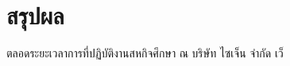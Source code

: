 \chapter{สรุปผล}
\label{chapter:conclusion}

ตลอดระยะเวลาการที่ปฏิบัติงานสหกิจศึกษา ณ บริษัท ไซเจ็น จำกัด เว็